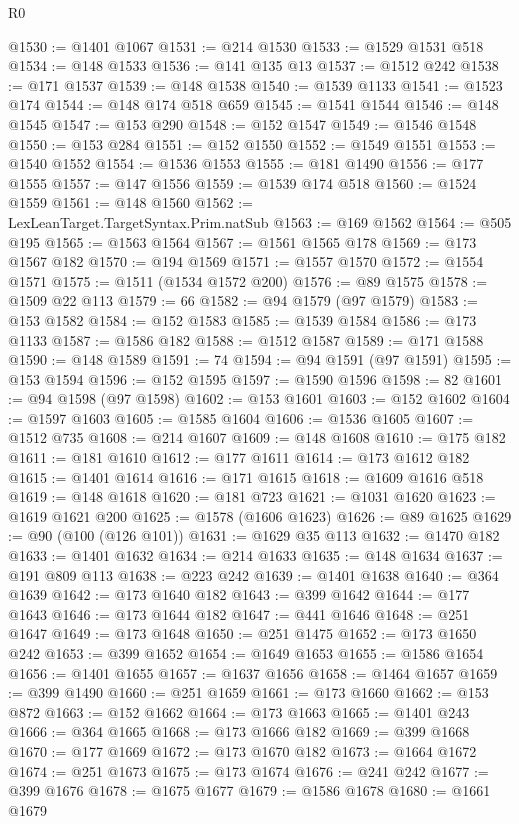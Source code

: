 \begin{lexlean}{R0}
\begin{coremodule}
@1530 := @1401 @1067
@1531 := @214 @1530
@1533 := @1529 @1531 @518
@1534 := @148 @1533
@1536 := @141 @135 @13
@1537 := @1512 @242
@1538 := @171 @1537
@1539 := @148 @1538
@1540 := @1539 @1133
@1541 := @1523 @174
@1544 := @148 @174 @518 @659
@1545 := @1541 @1544
@1546 := @148 @1545
@1547 := @153 @290
@1548 := @152 @1547
@1549 := @1546 @1548
@1550 := @153 @284
@1551 := @152 @1550
@1552 := @1549 @1551
@1553 := @1540 @1552
@1554 := @1536 @1553
@1555 := @181 @1490
@1556 := @177 @1555
@1557 := @147 @1556
@1559 := @1539 @174 @518
@1560 := @1524 @1559
@1561 := @148 @1560
@1562 := LexLeanTarget.TargetSyntax.Prim.natSub
@1563 := @169 @1562
@1564 := @505 @195
@1565 := @1563 @1564
@1567 := @1561 @1565 @178
@1569 := @173 @1567 @182
@1570 := @194 @1569
@1571 := @1557 @1570
@1572 := @1554 @1571
@1575 := @1511 (@1534 @1572 @200)
@1576 := @89 @1575
@1578 := @1509 @22 @113
@1579 := 66
@1582 := @94 @1579 (@97 @1579)
@1583 := @153 @1582
@1584 := @152 @1583
@1585 := @1539 @1584
@1586 := @173 @1133
@1587 := @1586 @182
@1588 := @1512 @1587
@1589 := @171 @1588
@1590 := @148 @1589
@1591 := 74
@1594 := @94 @1591 (@97 @1591)
@1595 := @153 @1594
@1596 := @152 @1595
@1597 := @1590 @1596
@1598 := 82
@1601 := @94 @1598 (@97 @1598)
@1602 := @153 @1601
@1603 := @152 @1602
@1604 := @1597 @1603
@1605 := @1585 @1604
@1606 := @1536 @1605
@1607 := @1512 @735
@1608 := @214 @1607
@1609 := @148 @1608
@1610 := @175 @182
@1611 := @181 @1610
@1612 := @177 @1611
@1614 := @173 @1612 @182
@1615 := @1401 @1614
@1616 := @171 @1615
@1618 := @1609 @1616 @518
@1619 := @148 @1618
@1620 := @181 @723
@1621 := @1031 @1620
@1623 := @1619 @1621 @200
@1625 := @1578 (@1606 @1623)
@1626 := @89 @1625
@1629 := @90 (@100 (@126 @101))
@1631 := @1629 @35 @113
@1632 := @1470 @182
@1633 := @1401 @1632
@1634 := @214 @1633
@1635 := @148 @1634
@1637 := @191 @809 @113
@1638 := @223 @242
@1639 := @1401 @1638
@1640 := @364 @1639
@1642 := @173 @1640 @182
@1643 := @399 @1642
@1644 := @177 @1643
@1646 := @173 @1644 @182
@1647 := @441 @1646
@1648 := @251 @1647
@1649 := @173 @1648
@1650 := @251 @1475
@1652 := @173 @1650 @242
@1653 := @399 @1652
@1654 := @1649 @1653
@1655 := @1586 @1654
@1656 := @1401 @1655
@1657 := @1637 @1656
@1658 := @1464 @1657
@1659 := @399 @1490
@1660 := @251 @1659
@1661 := @173 @1660
@1662 := @153 @872
@1663 := @152 @1662
@1664 := @173 @1663
@1665 := @1401 @243
@1666 := @364 @1665
@1668 := @173 @1666 @182
@1669 := @399 @1668
@1670 := @177 @1669
@1672 := @173 @1670 @182
@1673 := @1664 @1672
@1674 := @251 @1673
@1675 := @173 @1674
@1676 := @241 @242
@1677 := @399 @1676
@1678 := @1675 @1677
@1679 := @1586 @1678
@1680 := @1661 @1679

\end{coremodule}
\end{lexlean}
